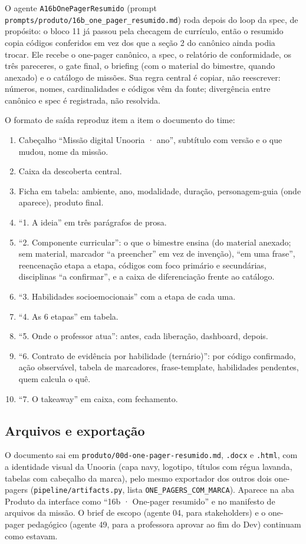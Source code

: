 \documentclass[11pt,a4paper]{article}
\newcommand{\arq}[1]{\texttt{\small #1}}
\begin{document}
O agente \arq{A16bOnePagerResumido} (prompt \arq{prompts/produto/16b\_one\_pager\_resumido.md}) roda depois do loop da spec, de propósito: o bloco 11 já passou pela checagem de currículo, então o resumido copia códigos conferidos em vez dos que a seção 2 do canônico ainda podia trocar. Ele recebe o one-pager canônico, a spec, o relatório de conformidade, os três pareceres, o gate final, o briefing (com o material do bimestre, quando anexado) e o catálogo de missões. Sua regra central é copiar, não reescrever: números, nomes, cardinalidades e códigos vêm da fonte; divergência entre canônico e spec é registrada, não resolvida.

O formato de saída reproduz item a item o documento do time:

\begin{enumerate}
\item Cabeçalho ``Missão digital Unooria · ano'', subtítulo com versão e o que mudou, nome da missão.
\item Caixa da descoberta central.
\item Ficha em tabela: ambiente, ano, modalidade, duração, personagem-guia (onde aparece), produto final.
\item ``1. A ideia'' em três parágrafos de prosa.
\item ``2. Componente curricular'': o que o bimestre ensina (do material anexado; sem material, marcador ``a preencher'' em vez de invenção), ``em uma frase'', reencenação etapa a etapa, códigos com foco primário e secundárias, disciplinas ``a confirmar'', e a caixa de diferenciação frente ao catálogo.
\item ``3. Habilidades socioemocionais'' com a etapa de cada uma.
\item ``4. As 6 etapas'' em tabela.
\item ``5. Onde o professor atua'': antes, cada liberação, dashboard, depois.
\item ``6. Contrato de evidência por habilidade (ternário)'': por código confirmado, ação observável, tabela de marcadores, frase-template, habilidades pendentes, quem calcula o quê.
\item ``7. O takeaway'' em caixa, com fechamento.
\end{enumerate}

\subsection{Arquivos e exportação}

O documento sai em \arq{produto/00d-one-pager-resumido.md}, \arq{.docx} e \arq{.html}, com a identidade visual da Unooria (capa navy, logotipo, títulos com régua lavanda, tabelas com cabeçalho da marca), pelo mesmo exportador dos outros dois one-pagers (\arq{pipeline/artifacts.py}, lista \arq{ONE\_PAGERS\_COM\_MARCA}). Aparece na aba Produto da interface como ``16b · One-pager resumido'' e no manifesto de arquivos da missão. O brief de escopo (agente 04, para stakeholders) e o one-pager pedagógico (agente 49, para a professora aprovar ao fim do Dev) continuam como estavam.
\end{document}
